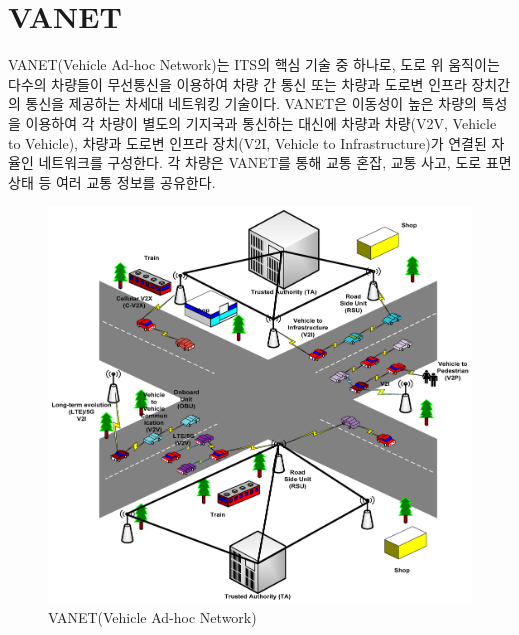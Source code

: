 \section{VANET}
    VANET(Vehicle Ad-hoc Network)는 ITS의 핵심 기술 중 하나로, 도로 위 움직이는 다수의 차량들이 무선통신을 이용하여 차량 간 통신 또는 차량과 도로변 인프라 장치간의 통신을 제공하는 차세대 네트워킹 기술이다. VANET은 이동성이 높은 차량의 특성을 이용하여 각 차량이 별도의 기지국과 통신하는 대신에 차량과 차량(V2V, Vehicle to Vehicle), 차량과 도로변 인프라 장치(V2I, Vehicle to Infrastructure)가 연결된 자율인 네트워크를 구성한다. 각 차량은 VANET를 통해 교통 혼잡, 교통 사고, 도로 표면 상태 등 여러 교통 정보를 공유한다. \\
    \vspace{-4mm}
    \begin{figure}[!h]\centering
		\includegraphics[width=.65\textwidth]{image/week13/2-1.png}
		\caption{\small VANET(Vehicle Ad-hoc Network)}
		\vspace{-10pt}
    \end{figure}